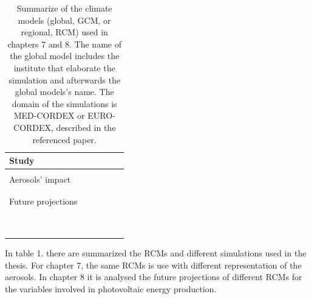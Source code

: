 \begin{table}[h!]
  \begin{tabular}{>{\raggedright}m{1.5cm}>{\raggedright}m{1.5cm}>{\raggedright}m{2cm}>{\raggedright}m{2cm}>{\raggedright}m{2cm}>{\raggedright}m{2cm}}
    \toprule 
    Study & \centering{Climate Model} & &\centering{Domain} & \centering{Simulation} \tabularnewline
    \midrule                                                         
    & \centering{GCM} & \centering{RCM} & \tabularnewline                                            
    \midrule
     Aerosols' impact & \centering{CNRM-CM5} & \centering{CNRM-ALADIN53} & \centering{MED-CORDEX} & \centering{AER}\midrule\\
    \centering{NO-AER}\midrule\\
    \centering{TREND}
    \tabularnewline
   \midrule
    Future projections & \centering{CNRM-CM5} & \centering{ALADIN53}\midrule\\
    \centering{RCA4}\midrule\\
    \centering{CCLM4}\midrule & \centering{EURO-CORDEX} & \centering{HIST/RCP85}\\
    \centering{HIST/RCP85}\\
    \centering{HIST/RCP85}
    \tabularnewline
          & \centering{ICHEC-EC-EARTH} & \centering{RACMO}\midrule\\
    \centering{RCA4}\midrule\\
    \centering{CCLM4}\midrule & \centering{EURO-CORDEX} & \centering{HIST/RCP85}\\
    \centering{HIST/RCP85}\\
    \centering{HIST/RCP85}
    \tabularnewline
 \bottomrule
  \end{tabular}
  \caption{Summarize of the climate models (global, GCM, or regional, RCM) used in chapters 7 and 8. The name of the global model includes the institute that elaborate the simulation and afterwards the global models's name. The domain of the simulations is MED-CORDEX or EURO-CORDEX, described in the referenced paper.}
  \label{climatemodels}
\end{table}


In table 1. there are summarized the RCMs and different simulations used in the thesis. For chapter 7, the same RCMs is use with different representation of the aerosols. In chapter 8 it is analysed the future projections of different RCMs for the variables involved in photovoltaic energy production.\\

